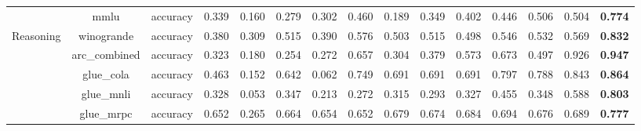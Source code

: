 \begin{table}[]
{\begin{tabular}{ccccccccccccccc}
                                   & mmlu                           & accuracy                         & 0.339              & 0.160             & 0.279                      & 0.302             & 0.460                      & 0.189               & 0.349                    & 0.402               & 0.446                        & 0.506                   & 0.504                  & \textbf{0.774} \\
\multirow{13}{*}{Reasoning}        & winogrande                     & accuracy                         & 0.380              & 0.309             & 0.515                      & 0.390             & 0.576                      & 0.503               & 0.515                    & 0.498               & 0.546                        & 0.532                   & 0.569                  & \textbf{0.832} \\
                                   & arc\_combined                  & accuracy                         & 0.323              & 0.180             & 0.254                      & 0.272             & 0.657                      & 0.304               & 0.379                    & 0.573               & 0.673                        & 0.497                   & 0.926                  & \textbf{0.947} \\
                                   & glue\_cola                     & accuracy                         & 0.463              & 0.152             & 0.642                      & 0.062             & 0.749                      & 0.691               & 0.691                    & 0.691               & 0.797                        & 0.788                   & 0.843                  & \textbf{0.864} \\
                                   & glue\_mnli                     & accuracy                         & 0.328              & 0.053             & 0.347                      & 0.213             & 0.272                      & 0.315               & 0.293                    & 0.327               & 0.455                        & 0.348                   & 0.588                  & \textbf{0.803} \\
                                   & glue\_mrpc                     & accuracy                         & 0.652              & 0.265             & 0.664                      & 0.654             & 0.652                      & 0.679               & 0.674                    & 0.684               & 0.694                        & 0.676                   & 0.689                  & \textbf{0.777} \\

\end{tabular}}
\end{table}
